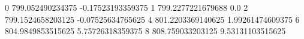 0 799.052490234375 -0.17523193359375
1 799.2277221679688 0.0
2 799.1524658203125 -0.07525634765625
4 801.2203369140625 1.99261474609375
6 804.9849853515625 5.75726318359375
8 808.759033203125 9.53131103515625

